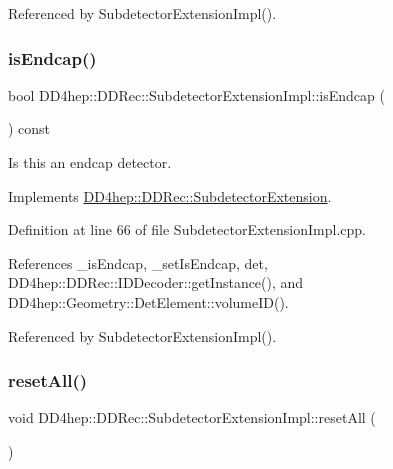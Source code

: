 Referenced by Subdetector\+Extension\+Impl().

\hypertarget{class_d_d4hep_1_1_d_d_rec_1_1_subdetector_extension_impl_a2381b0fbcdaaedff410cff6a56c74d45}{}\label{class_d_d4hep_1_1_d_d_rec_1_1_subdetector_extension_impl_a2381b0fbcdaaedff410cff6a56c74d45} 
\subsubsection{\texorpdfstring{is\+Endcap()}{isEndcap()}}
{\footnotesize\ttfamily bool D\+D4hep\+::\+D\+D\+Rec\+::\+Subdetector\+Extension\+Impl\+::is\+Endcap (\begin{DoxyParamCaption}{ }\end{DoxyParamCaption}) const\hspace{0.3cm}{\ttfamily [virtual]}}



Is this an endcap detector. 



Implements \hyperlink{class_d_d4hep_1_1_d_d_rec_1_1_subdetector_extension_a57a044e743f899391ac4a89fc0035e08}{D\+D4hep\+::\+D\+D\+Rec\+::\+Subdetector\+Extension}.



Definition at line 66 of file Subdetector\+Extension\+Impl.\+cpp.



References \+\_\+is\+Endcap, \+\_\+set\+Is\+Endcap, det, D\+D4hep\+::\+D\+D\+Rec\+::\+I\+D\+Decoder\+::get\+Instance(), and D\+D4hep\+::\+Geometry\+::\+Det\+Element\+::volume\+I\+D().



Referenced by Subdetector\+Extension\+Impl().

\hypertarget{class_d_d4hep_1_1_d_d_rec_1_1_subdetector_extension_impl_aadfe7c78e6a5d977d9d2f9d6a6222618}{}\label{class_d_d4hep_1_1_d_d_rec_1_1_subdetector_extension_impl_aadfe7c78e6a5d977d9d2f9d6a6222618} 
\subsubsection{\texorpdfstring{reset\+All()}{resetAll()}}
{\footnotesize\ttfamily void D\+D4hep\+::\+D\+D\+Rec\+::\+Subdetector\+Extension\+Impl\+::reset\+All (\begin{DoxyParamCaption}{ }\end{DoxyParamCaption})\hspace{0.3cm}{\ttfamily [protected]}}



